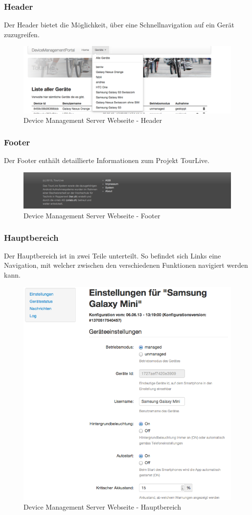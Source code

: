 \subsubsection{Header}
Der Header bietet die Möglichkeit, über eine Schnellnavigation auf ein Gerät zuzugreifen. 
\begin{figure}[H]
	\centering
	\includegraphics[width=120mm]{images/devmgmtsrv/header.png}
	\caption{Device Management Server Webseite - Header}
\end{figure}

\pagebreak
\subsubsection{Footer}
Der Footer enthält detaillierte Informationen zum Projekt TourLive. 
 
\begin{figure}[H]
	\centering
	\includegraphics[width=120mm]{images/devmgmtsrv/footer.png}
	\caption{Device Management Server Webseite - Footer}
\end{figure}


\subsubsection{Hauptbereich}
Der Hauptbereich ist in zwei Teile unterteilt. So befindet sich Links eine Navigation, mit welcher zwischen den verschiedenen Funktionen navigiert werden kann. 
 
\begin{figure}[H]
	\centering
	\includegraphics[width=120mm]{images/devmgmtsrv/settings.png}
	\caption{Device Management Server Webseite - Hauptbereich}
\end{figure}

